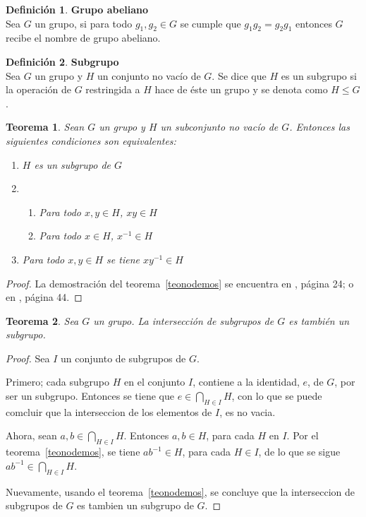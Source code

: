 \documentclass[11pt]{book}
\newtheorem{theorem}{Teorema}
\theoremstyle{definition}
\newtheorem{definition}{Definición}
\begin{document}
\begin{definition}\textbf{Grupo abeliano}\\
  Sea $G$ un grupo, si para todo $g_1,g_2\in G$ se cumple que
  $g_1g_2=g_2g_1$ entonces $G$ recibe el nombre de grupo abeliano.
\end{definition}


\begin{definition}\textbf{Subgrupo}\\
  Sea $G$ un grupo y $H$ un conjunto no vacío de $G$. Se dice que $H$
  es un subgrupo si la operación de $G$ restringida a $H$ hace de
  \'este un grupo y se denota como $H\le G$.
\end{definition}


\begin{theorem}\label{subgrupo}
  Sean $G$ un grupo y $H$ un subconjunto no vacío de $G$. Entonces las
  siguientes condiciones son equivalentes:
  \begin{enumerate}
  \item $H$ es un subgrupo de $G$
  \item \begin{enumerate}
    \item Para todo $x,y \in H$, $xy\in H$
    \item Para todo $x\in H$, $x^{-1}\in H$
    \end{enumerate}
  \item Para todo $x,y \in H$ se tiene $xy^{-1}\in H$
  \end{enumerate}\label{teonodemos}
\end{theorem}

\begin{proof}
  La demostración del teorema~\ref{teonodemos} se encuentra en
  \cite{Barrera}, página 24; o en \cite{Ehrlich}, página 44.
\end{proof}

\begin{theorem}
Sea $G$ un grupo. La intersección de subgrupos de $G$ es también un subgrupo. 
\end{theorem}

\begin{proof}
Sea $I$ un conjunto de subgrupos de $G$. 

Primero; cada subgrupo $H$ en el conjunto $I$, contiene a la identidad,
$e$, de $G$, por ser un subgrupo. Entonces se tiene que
$e\in \bigcap_{H\in I}H$, con lo que se puede comcluir que la
interseccion de los elementos de $I$, es no vacia.

Ahora, sean $a,b\in \bigcap_{H\in I}H$. Entonces $a,b\in H$,
para cada $H$ en $I$. Por el teorema~\ref{teonodemos}, se tiene
$ab^{-1}\in H$, para cada $H\in I$, de lo que se sigue $ab^{-1}\in
\bigcap_{H\in I}H$.

Nuevamente, usando el teorema~\ref{teonodemos}, se concluye que la
interseccion de subgrupos de $G$ es tambien un subgrupo de $G$.
\end{proof}
\end{document}
